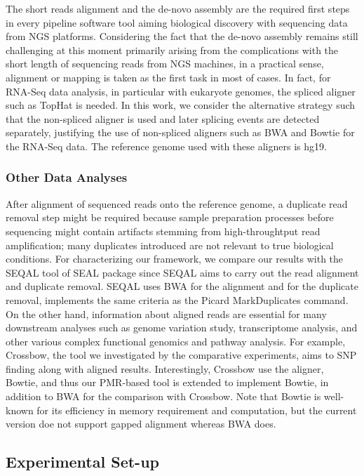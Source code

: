 \documentclass{sig-alternate}
\begin{document}
The short reads alignment and the de-novo assembly are the required first steps in every pipeline software tool aiming biological discovery with sequencing data from NGS platforms.  Considering the fact that the de-novo assembly remains still challenging at this moment primarily arising from the complications with the short length of sequencing reads from NGS machines, in a practical sense, alignment or mapping is taken as the first task in most of cases.  In fact, for RNA-Seq data analysis, in particular with eukaryote genomes, the spliced aligner such as TopHat\cite{pepke2009} is needed. In this work, we consider the alternative strategy such that the non-spliced aligner is used and later splicing events are detected separately, justifying the use of non-spliced aligners such as BWA and Bowtie for the RNA-Seq data.  The reference genome used with these aligners is hg19.

\subsubsection{Other Data Analyses}

After alignment of sequenced reads onto the reference genome, a duplicate read removal step might be required because sample preparation processes before sequencing might contain artifacts stemming from high-throughtput read amplification; many duplicates introduced are not relevant to true biological conditions.  For characterizing our framework, we compare our results with the SEQAL tool of SEAL package since SEQAL aims to carry out the read alignment and duplicate removal.  SEQAL uses BWA for the alignment and for the duplicate removal, implements the same criteria as the Picard MarkDuplicates command\cite{seal2011,seal_2011_mapred}.  On the other hand, information about aligned reads are essential for many downstream analyses such as genome variation study, transcriptome analysis, and other various complex functional genomics and pathway analysis.  For example, Crossbow, the tool we investigated by the comparative experiments, aims to SNP finding along with aligned results\cite{langmead2009}.  Interestingly, Crossbow use the aligner, Bowtie, and thus our PMR-based tool is extended to implement Bowtie, in addition to BWA for the comparison with Crossbow.  Note that Bowtie is well-known for its efficiency in memory requirement and computation, but the current version doe not support gapped alignment whereas BWA does.

\subsection{Experimental Set-up}
\end{document}
